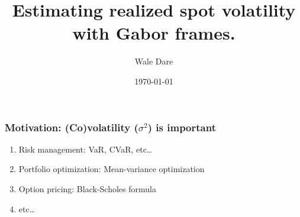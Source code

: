 \documentclass[fleqn]{beamer}
\title[Short title]{Estimating realized spot  volatility with Gabor frames.} %
\author{Wale Dare} %
\institute[University of St. Gallen] %
{
University of St. Gallen \\ %
\medskip
}
\date{\today} %
\begin{document}
\begin{frame}
\titlepage %
\end{frame}
\begin{frame}
  \frametitle{Motivation: (Co)volatility ($\sigma^2$) is important}
\begin{enumerate}
  \item Risk management: VaR, CVaR, etc\ldots
  \item Portfolio optimization: Mean-variance optimization 
  \item Option pricing: Black-Scholes formula
  \item etc\ldots
\end{enumerate}
\tableofcontents %
\end{frame}
\end{document}
